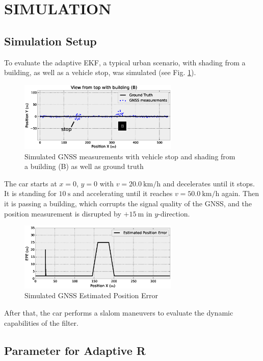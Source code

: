 \documentclass[a4paper,twoside]{article}
\begin{document}
\section{\uppercase{Simulation}}

\subsection{Simulation Setup}

To evaluate the adaptive EKF, a typical urban scenario, with shading from a building, as well as a vehicle stop, was simulated (see Fig. \ref{Testdata}).

\begin{figure}[ht]
\centering
\includegraphics[width=3.0in]{images/Testdata}
\caption{Simulated GNSS measurements with vehicle stop and shading from a building (B) as well as ground truth}
\label{Testdata}
\end{figure}

The car starts at $x=0$, $y=0$ with $v=\SI{20.0}{\kilo\metre\per\hour}$ and decelerates until it stops. It is standing for $\SI{10}{\second}$ and accelerating until it reaches $v=\SI{50.0}{\kilo\metre\per\hour}$ again. Then it is passing a building, which corrupts the signal quality of the GNSS, and the position measurement is disrupted by $+\SI{15}{\metre}$ in $y$-direction.

\begin{figure}[ht]
\centering
\includegraphics[width=3.0in]{images/Testdata-EPE}
\caption{Simulated GNSS Estimated Position Error}
\label{Testdata-EPE}
\end{figure}

After that, the car performs a slalom maneuvers to evaluate the dynamic capabilities of the filter.

\subsection{Parameter for Adaptive R}
\end{document}
